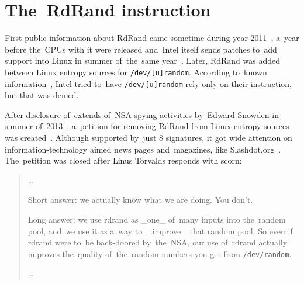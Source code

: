 \chapter{The~RdRand instruction}  \label{chap:rdrand-instruction}
\par{
First public information about RdRand came sometime during year 
2011~\cite{IntelRdRandFindAbout}, a~year before the~CPUs with it were released
 and~Intel itself sends patches to~add support into Linux in summer of~the~same 
 year~\cite{KernelRdRand}. Later, RdRand was added between Linux entropy 
 sources for {\tt /dev/[u]random}. According to~known 
 information~\cite{TheodoreTsoNSA}, Intel tried to~have {\tt /dev/[u]random} rely
  only on their instruction, but that was denied. 
}

\par{
After disclosure of~extends of~NSA spying activities by~Edward Snowden 
in summer of~2013~\cite{GuardianNSA,DailymailNSA}, a~petition for removing 
RdRand from Linux entropy sources was created~\cite{PetitionRdRand}. 
Although supported by~just 8 signatures, it got wide attention on 
information-technology aimed news pages and~magazines, like Slashdot.org~\cite{PetitionRdRandSlashdot}. The~petition was closed after Linus Torvalds 
responds with scorn:
}
\begin{quote} \par{\dots}
\par{
Short answer: we actually know what we are doing. You don't.
}
\par{
Long answer: we use rdrand as \_one\_ of~many inputs into the~random pool, 
and~we use it as a~way to~\_improve\_ that random pool. 
So even if rdrand were to~be back-doored by~the~NSA, our use of~rdrand 
actually improves the~quality of~the~random numbers you get 
from {\tt /dev/random}.
}
\par{\dots}
\end{quote}

